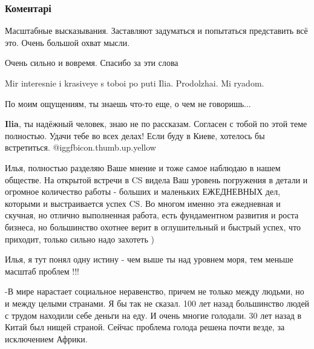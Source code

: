  
 
 
 
 
\subsubsection{Коментарі}
\label{sec:18_11_2021.fb.kenigshtein_ilja.1.glavnyj_putj_cheloveka.cmt}

\begin{itemize} %
Масштабные высказывания. Заставляют задуматься и попытаться представить всё это. Очень большой охват мысли.

Очень сильно и вовремя. Спасибо за эти слова

Mir interesnie i krasiveye s toboi po puti Ilia. Prodolzhai. Mi ryadom.

По моим ощущениям, ты знаешь что-то еще, о чем не говоришь...

\textbf{Ilia}, ты надёжный человек, знаю не по рассказам. Согласен с тобой по этой теме полностью. Удачи тебе во всех делах! Если буду в Киеве, хотелось бы встретиться.  @igg{fbicon.thumb.up.yellow} 


Илья, полностью разделяю Ваше мнение и тоже самое наблюдаю в нашем обществе. На
открытой встречи в CS видела Ваш уровень погружения в детали и огромное
количество работы - больших и маленьких ЕЖЕДНЕВНЫХ дел, которыми и
выстраивается успех CS. Во многом именно эта ежедневная и скучная, но отлично
выполненная работа, есть фундаментном развития и роста бизнеса, но большинство
охотнее верит в оглушительный и быстрый успех, что приходит, только сильно надо
захотеть )


Илья, я тут понял одну истину - чем выше ты над уровнем моря, тем меньше масштаб проблем !!!


-В мире нарастает социальное неравенство, причем не только между людьми, но и между целыми странами.
Я бы так не сказал.
100 лет назад большинство людей с трудом находили себе деньги на еду. И очень многие голодали.
30 лет назад в Китай был нищей страной.
Сейчас проблема голода решена почти везде, за исключением Африки.


\end{itemize}
